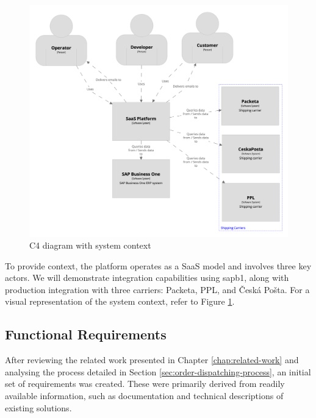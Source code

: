\begin{figure}[H]\centering
\includegraphics[width=140mm]{img/chap02/fig_system_context.png}
\caption{C4 diagram with system context}
\label{img02:analysis.system-context}
\end{figure}

To provide context, the platform operates as a \ac{SaaS} model and involves three key actors. We will demonstrate integration capabilities using \gls{sapb1}, along with production integration with three carriers: Packeta, PPL, and Česká Pošta. For a visual representation of the system context, refer to Figure \ref{img02:analysis.system-context}.

\subsection{Functional Requirements}
\label{subsec:functional-requirements}

After reviewing the related work presented in Chapter \ref{chap:related-work} and analysing the process detailed in Section \ref{sec:order-dispatching-process}, an initial set of requirements was created.
These were primarily derived from readily available information, such as documentation and technical descriptions of existing solutions.

